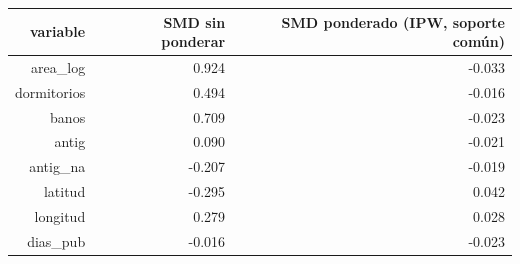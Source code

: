 \begin{tabular}{rrr}
\toprule
variable & SMD sin ponderar & SMD ponderado (IPW, soporte común) \\
\midrule
area\_log & 0.924 & -0.033 \\
dormitorios & 0.494 & -0.016 \\
banos & 0.709 & -0.023 \\
antig & 0.090 & -0.021 \\
antig\_na & -0.207 & -0.019 \\
latitud & -0.295 & 0.042 \\
longitud & 0.279 & 0.028 \\
dias\_pub & -0.016 & -0.023 \\
\bottomrule
\end{tabular}